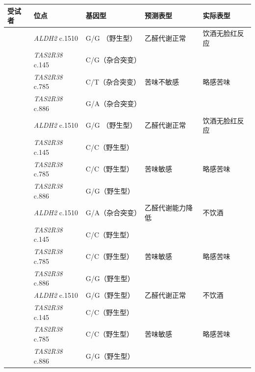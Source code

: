 \documentclass[10pt]{article}
\begin{document}
\begin{table}[H]
    \centering
    \begin{tabular}{>{\raggedright\arraybackslash}p{1.5cm} >{\raggedright\arraybackslash}p{3cm} >{\raggedright\arraybackslash}p{3.5cm} >{\raggedright\arraybackslash}p{3cm} >{\raggedright\arraybackslash}p{3cm}}
        \toprule
        \textbf{受试者} & \textbf{位点} & \textbf{基因型} & \textbf{预测表型} & \textbf{实际表型} \\
        \midrule

        \multirow{4}{*}{张乐} 
        & \textit{ALDH2} c.1510 & G/G （野生型） & 乙醛代谢正常 & 饮酒无脸红反应 \\
        \cmidrule(lr){2-5}
        & \textit{TAS2R38} c.145 & C/G（杂合突变） & & \\
        & \textit{TAS2R38} c.785 & C/T（杂合突变） & 苦味不敏感 & 略感苦味 \\
        & \textit{TAS2R38} c.886 & G/A（杂合突变） & & \\

        \midrule

        \multirow{4}{*}{刘晋林} 
        & \textit{ALDH2} c.1510 & G/G （野生型） & 乙醛代谢正常 & 饮酒无脸红反应 \\
        \cmidrule(lr){2-5}
        & \textit{TAS2R38} c.145 & C/C（野生型） & & \\
        & \textit{TAS2R38} c.785 & C/C（野生型） & 苦味敏感 & 略感苦味 \\
        & \textit{TAS2R38} c.886 & G/G（野生型） & & \\

        \midrule

        \multirow{4}{*}{姜歆宇} 
        & \textit{ALDH2} c.1510 & G/A（杂合突变） & 乙醛代谢能力降低 & 不饮酒 \\
        \cmidrule(lr){2-5}
        & \textit{TAS2R38} c.145 & C/C（野生型） & & \\
        & \textit{TAS2R38} c.785 & C/C（野生型） & 苦味敏感 & 略感苦味 \\
        & \textit{TAS2R38} c.886 & G/G（野生型） & & \\

        \midrule

        \multirow{4}{*}{韩翔宇} 
        & \textit{ALDH2} c.1510 & G/G（野生型） & 乙醛代谢正常 & 不饮酒 \\
        \cmidrule(lr){2-5}
        & \textit{TAS2R38} c.145 & C/C（野生型） & & \\
        & \textit{TAS2R38} c.785 & C/C（野生型） & 苦味敏感 & 略感苦味 \\
        & \textit{TAS2R38} c.886 & G/G（野生型） & & \\


\end{tabular}
\end{table}
\end{document}
